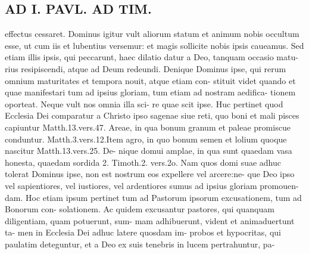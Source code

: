 \documentclass{article}
\begin{document}
\begin{pages}
\section*{AD I. PAVL. AD TIM. }
\marginpar{[ p.386 ]}effectus cessaret. Dominus igitur vult aliorum statum et animum nobis occultum esse, ut cum iis et lubentius versemur: et magis sollicite nobis ipsis caueamus. Sed etiam illis ipsis, qui peccarunt, haec dilatio datur a Deo, tanquam occasio matu- rius resipiscendi, atque ad Deum redeundi. Denique Dominus ipse, qui rerum omnium maturitates et tempora nouit, atque etiam con- stituit videt quando et quae manifestari tum ad ipsius gloriam, tum etiam ad nostram aedifica- tionem oporteat. Neque vult nos omnia illa sci- re quae scit ipse. Huc pertinet quod Ecclesia Dei comparatur a Christo ipso sagenae siue reti, quo boni et mali pisces capiuntur Matth.13.vers.47. Areae, in qua bonum granum et paleae promiscue conduntur. Matth.3.vers.12.Item agro, in quo bonum semen et lolium quoque nascitur Matth.13.vers.25. De- nique domui amplae, in qua sunt quaedam vasa honesta, quaedam sordida 2. Timoth.2. vers.2o. Nam quos domi suae adhuc tolerat Dominus ipse, non est nostrum eos expellere vel arcere:ne- que Deo ipso vel sapientiores, vel iustiores, vel ardentiores sumus ad ipsius gloriam promouen- dam. Hoc etiam ipsum pertinet tum ad Pastorum ipsorum excusationem, tum ad Bonorum con- solationem. Ac quidem excusantur pastores, qui quanquam diligentiam, quam potuerunt, sum- mam adhibuerunt, vident et animaduertunt ta- men in Ecclesia Dei adhuc latere quosdam im- probos et hypocritas, qui paulatim deteguntur, et a Deo ex suis tenebris in lucem pertrahuntur, pa- 

\end{pages}
\end{document}
